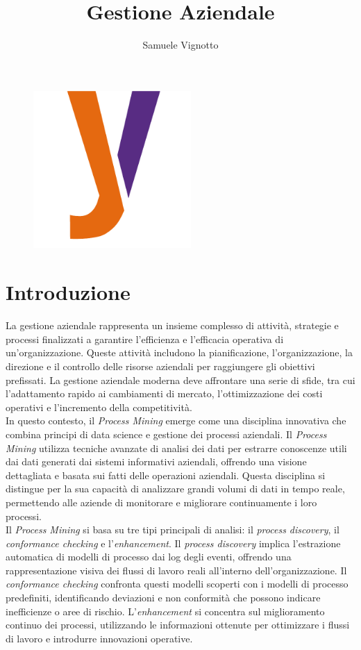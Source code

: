 \documentclass{article}
\title{\Huge{\textbf{Gestione Aziendale}}\vspace{-1em}}
\author{Samuele Vignotto}
\date{}
\begin{document}
\maketitle
\begin{figure}[h]
  \centering
  \includegraphics[width=6cm, height=6cm]{Logo/Y_LOGO-SOLO.png}
  \label{fig:immagine}
\end{figure}

\newpage
\tableofcontents
\newpage

\section{Introduzione}
La gestione aziendale rappresenta un insieme complesso di attività, strategie e processi finalizzati a garantire l'efficienza e l'efficacia operativa di un'organizzazione. Queste attività includono la pianificazione, l'organizzazione, la direzione e il controllo delle risorse aziendali per raggiungere gli obiettivi prefissati. La gestione aziendale moderna deve affrontare una serie di sfide, tra cui l'adattamento rapido ai cambiamenti di mercato, l'ottimizzazione dei costi operativi e l'incremento della competitività.\\

In questo contesto, il \textit{Process Mining} emerge come una disciplina innovativa che combina principi di data science e gestione dei processi aziendali. Il \textit{Process Mining} utilizza tecniche avanzate di analisi dei dati per estrarre conoscenze utili dai dati generati dai sistemi informativi aziendali, offrendo una visione dettagliata e basata sui fatti delle operazioni aziendali. Questa disciplina si distingue per la sua capacità di analizzare grandi volumi di dati in tempo reale, permettendo alle aziende di monitorare e migliorare continuamente i loro processi.\\

Il \textit{Process Mining} si basa su tre tipi principali di analisi: il \textit{process discovery}, il \textit{conformance checking} e l'\textit{enhancement}. Il \textit{process discovery} implica l'estrazione automatica di modelli di processo dai log degli eventi, offrendo una rappresentazione visiva dei flussi di lavoro reali all'interno dell'organizzazione. Il \textit{conformance checking} confronta questi modelli scoperti con i modelli di processo predefiniti, identificando deviazioni e non conformità che possono indicare inefficienze o aree di rischio. L'\textit{enhancement} si concentra sul miglioramento continuo dei processi, utilizzando le informazioni ottenute per ottimizzare i flussi di lavoro e introdurre innovazioni operative.\\
\end{document}
